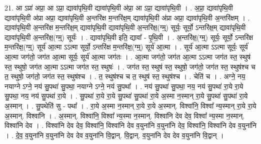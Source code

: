 \documentclass[17pt]{extarticle}
\begin{document}
21. आ ऽप्रा॑ अप्रा॒ आ ऽप्रा॒ द्यावा॑पृथि॒वी द्यावा॑पृथि॒वी अ॑प्रा॒ आ ऽप्रा॒ द्यावा॑पृथि॒वी । . अ॒प्रा॒ द्यावा॑पृथि॒वी द्यावा॑पृथि॒वी अ॑प्रा अप्रा॒ द्यावा॑पृथि॒वी अ॒न्तरि॑क्ष म॒न्तरि॑क्ष॒म् द्यावा॑पृथि॒वी अ॑प्रा अप्रा॒ द्यावा॑पृथि॒वी अ॒न्तरि॑क्षम् । . द्यावा॑पृथि॒वी अ॒न्तरि॑क्ष म॒न्तरि॑क्ष॒म् द्यावा॑पृथि॒वी द्यावा॑पृथि॒वी अ॒न्तरि॑क्ष॒(ग्म्॒) सूर्यः॒ सूर्यो॒ ऽन्तरि॑क्ष॒म् द्यावा॑पृथि॒वी द्यावा॑पृथि॒वी अ॒न्तरि॑क्ष॒(ग्म्॒) सूर्यः॑ । . द्यावा॑पृथि॒वी इति॒ द्यावा᳚ - पृ॒थि॒वी । . अ॒न्तरि॑क्ष॒(ग्म्॒) सूर्यः॒ सूर्यो॒ ऽन्तरि॑क्ष म॒न्तरि॑क्ष॒(ग्म्॒) सूर्य॑ आ॒त्मा ऽऽत्मा सूर्यो॒ ऽन्तरि॑क्ष म॒न्तरि॑क्ष॒(ग्म्॒) सूर्य॑ आ॒त्मा । . सूर्य॑ आ॒त्मा ऽऽत्मा सूर्यः॒ सूर्य॑ आ॒त्मा जग॑तो॒ जग॑त आ॒त्मा सूर्यः॒ सूर्य॑ आ॒त्मा जग॑तः । . आ॒त्मा जग॑तो॒ जग॑त आ॒त्मा ऽऽत्मा जग॑त स्त॒ स्थुष॑ स्त॒ स्थुषो॒ जग॑त आ॒त्मा ऽऽत्मा जग॑त स्त॒ स्थुषः॑ । . जग॑त स्त॒ स्थुष॑ स्त॒ स्थुषो॒ जग॑तो॒ जग॑त स्त॒ स्थुष॑श्च च त॒ स्थुषो॒ जग॑तो॒ जग॑त स्त॒ स्थुष॑श्च । . त॒ स्थुष॑श्च च त॒ स्थुष॑ स्त॒ स्थुष॑श्च । . चेति॑ च । . अग्ने॒ नय॒ नयाग्ने ऽग्ने॒ नय॑ सु॒पथा॑ सु॒पथा॒ नयाग्ने ऽग्ने॒ नय॑ सु॒पथा᳚ । . नय॑ सु॒पथा॑ सु॒पथा॒ नय॒ नय॑ सु॒पथा॑ रा॒ये रा॒ये सु॒पथा॒ नय॒ नय॑ सु॒पथा॑ रा॒ये । . सु॒पथा॑ रा॒ये रा॒ये सु॒पथा॑ सु॒पथा॑ रा॒ये अ॒स्मा न॒स्मान् रा॒ये सु॒पथा॑ सु॒पथा॑ रा॒ये अ॒स्मान् । . सु॒पथेति॑ सु - पथा᳚ । . रा॒ये अ॒स्मा न॒स्मान् रा॒ये रा॒ये अ॒स्मान्. विश्वा॑नि॒ विश्वा᳚ न्य॒स्मान् रा॒ये रा॒ये अ॒स्मान्. विश्वा॑नि । . अ॒स्मान्. विश्वा॑नि॒ विश्वा᳚ न्य॒स्मा न॒स्मान्. विश्वा॑नि देव देव॒ विश्वा᳚ न्य॒स्मा न॒स्मान्. विश्वा॑नि देव । . विश्वा॑नि देव देव॒ विश्वा॑नि॒ विश्वा॑नि देव व॒युना॑नि व॒युना॑नि देव॒ विश्वा॑नि॒ विश्वा॑नि देव व॒युना॑नि । . दे॒व॒ व॒युना॑नि व॒युना॑नि देव देव व॒युना॑नि वि॒द्वान्. वि॒द्वान्. व॒युना॑नि देव देव व॒युना॑नि वि॒द्वान् । \newline
\end{document}
